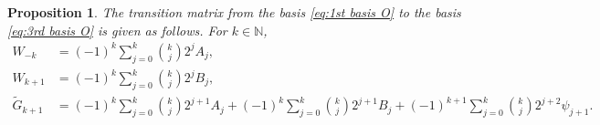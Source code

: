 \documentclass[11pt]{article}%
\theoremstyle{definition}
\theoremstyle{plain}
\newtheorem{proposition}[definition]{Proposition}
\begin{document}
\begin{proposition}\label{lem:tm 1st 3rd}
The transition matrix from the basis \eqref{eq:1st basis O} to the basis \eqref{eq:3rd basis O} is given as follows.
For $k \in \mathbb{N}$,
\begin{align}
	W_{-k} & = (-1)^k \sum_{j=0}^k  {k \choose j} 2^j A_{j}, \label{eq(1):tm 1st 3rd} \\
	W_{k+1} & = (-1)^k \sum_{j=0}^k  {k \choose j} 2^j B_{j}, \label{eq(2):tm 1st 3rd} \\
	\tilde{G}_{k+1}
	& = 	(-1)^{k} \sum_{j=0}^k  {k \choose j} 2^{j+1} A_j
		+ (-1)^{k} \sum_{j=0}^k  {k \choose j} 2^{j+1} B_j
		+ (-1)^{k+1} \sum_{j=0}^k  {k \choose j} 2^{j+2} \psi_{j+1}. \label{eq(3):tm 1st 3rd}
\end{align}
\end{proposition}
\end{document}
